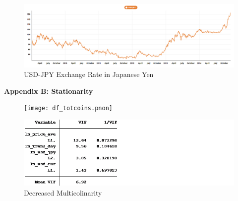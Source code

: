\documentclass{article}[10 pt]
\newcommand{\vs}{\vspace{0.1in}}
\begin{document}
\vs

\begin{figure}[ht!]

\centering

\includegraphics[width=150mm]{USD_JPY.png}

\caption{USD-JPY Exchange Rate in Japanese Yen}

\label{overflow}

\end{figure}

\clearpage

\textbf{Appendix B: Stationarity}

\vspace{5mm}

\begin{figure}[ht!]

\centering

\texttt{[image: df\_totcoins.pnon]}

\label{overflow}

\end{figure}

\vspace{3mm}

\begin{figure}[ht!]

\centering

\includegraphics[width=125mm]{reg4_vif.png}

\caption{Decreased Multicolinarity}

\label{overflow}

\end{figure}

\vspace{3mm}
\end{document}
